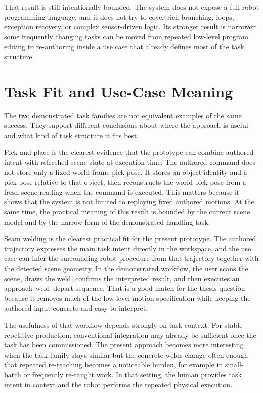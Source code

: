 That result is still intentionally bounded. The system does not expose a full robot programming language, and it does not try to cover rich branching, loops, exception recovery, or complex sensor-driven logic. Its stronger result is narrower: some frequently changing tasks can be moved from repeated low-level program editing to re-authoring inside a use case that already defines most of the task structure.

\section{Task Fit and Use-Case Meaning}

The two demonstrated task families are not equivalent examples of the same success. They support different conclusions about where the approach is useful and what kind of task structure it fits best.

Pick-and-place is the clearest evidence that the prototype can combine authored intent with refreshed scene state at execution time. The authored command does not store only a fixed world-frame pick pose. It stores an object identity and a pick pose relative to that object, then reconstructs the world pick pose from a fresh scene reading when the command is executed. This matters because it shows that the system is not limited to replaying fixed authored motions. At the same time, the practical meaning of this result is bounded by the current scene model and by the narrow form of the demonstrated handling task.

Seam welding is the clearest practical fit for the present prototype. The authored trajectory expresses the main task intent directly in the workspace, and the use case can infer the surrounding robot procedure from that trajectory together with the detected scene geometry. In the demonstrated workflow, the user scans the scene, draws the weld, confirms the interpreted result, and then executes an approach--weld--depart sequence. That is a good match for the thesis question because it removes much of the low-level motion specification while keeping the authored input concrete and easy to interpret.

The usefulness of that workflow depends strongly on task context. For stable repetitive production, conventional integration may already be sufficient once the task has been commissioned. The present approach becomes more interesting when the task family stays similar but the concrete welds change often enough that repeated re-teaching becomes a noticeable burden, for example in small-batch or frequently re-taught work. In that setting, the human provides task intent in context and the robot performs the repeated physical execution.

